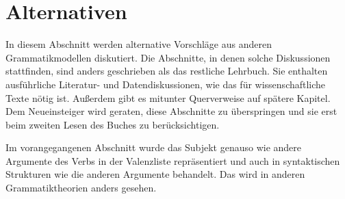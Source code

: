 \section{Alternativen}

In diesem Abschnitt werden alternative Vorschläge aus anderen Grammatikmodellen diskutiert.
Die Abschnitte, in denen solche Diskussionen stattfinden, sind anders geschrieben als das restliche
Lehrbuch. Sie enthalten ausführliche Literatur- und Datendiskussionen, wie das für wissenschaftliche
Texte nötig ist. Außerdem gibt es mitunter Querverweise auf spätere Kapitel. Dem Neueinsteiger
wird geraten, diese Abschnitte zu überspringen und sie erst beim zweiten Lesen des Buches zu berücksichtigen.

Im vorangegangenen Abschnitt wurde das Subjekt genauso wie andere Argumente des Verbs
in der Valenzliste repräsentiert und auch in syntaktischen Strukturen wie die anderen
Argumente behandelt. Das wird in anderen Grammatiktheorien anders gesehen.

